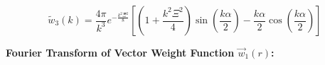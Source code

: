 \documentclass[letterpaper,twocolumn,amsmath,amssymb,prb]{revtex4-1}
\begin{document}
\begin{widetext}

\begin{equation}
    \widetilde{w}_3(k)=\frac{4\pi}{k^3}
    e^{-\frac{k^2\Xi^2}{8}}
    \left[\left(1+\frac{k^2\Xi^2}{4}\right)\sin\left(\frac{k\alpha}{2}\right)
      -\frac{k\alpha}{2}\cos\left(\frac{k\alpha}{2}\right)\right]
\end{equation}
\[{}\]

\noindent\textbf{Fourier Transform of Vector Weight Function $\vec{w}_1(r)$:}


\end{widetext}
\end{document}
